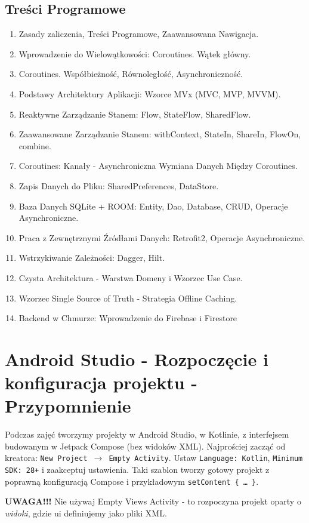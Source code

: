 \subsection{Treści Programowe}
\begin{enumerate}
  \item Zasady zaliczenia, Treści Programowe, Zaawansowana Nawigacja.
  \item Wprowadzenie do Wielowątkowości: Coroutines. Wątek główny.
  \item Coroutines. Współbieżność, Równoległość, Asynchroniczność.
  \item Podstawy Architektury Aplikacji: Wzorce MVx (MVC, MVP, MVVM).
  \item Reaktywne Zarządzanie Stanem: Flow, StateFlow, SharedFlow.
  \item Zaawansowane Zarządzanie Stanem: withContext, StateIn, ShareIn, FlowOn, combine.
  \item Coroutines: Kanały - Asynchroniczna Wymiana Danych Między Coroutines.
  \item Zapis Danych do Pliku: SharedPreferences, DataStore.
  \item Baza Danych SQLite + ROOM: Entity, Dao, Database, CRUD, Operacje Asynchroniczne.
  \item Praca z Zewnętrznymi Źródłami Danych: Retrofit2, Operacje Asynchroniczne.
  \item Wstrzykiwanie Zależności: Dagger, Hilt.
  \item Czysta Architektura - Warstwa Domeny i Wzorzec Use Case.
  \item Wzorzec Single Source of Truth - Strategia Offline Caching.
  \item Backend w Chmurze: Wprowadzenie do Firebase i Firestore
\end{enumerate}

\section{Android Studio - Rozpoczęcie i konfiguracja projektu - Przypomnienie}
Podczas zajęć tworzymy projekty w Android Studio, w Kotlinie, z interfejsem budowanym w Jetpack Compose (bez widoków XML). Najprościej zacząć od kreatora: \texttt{New Project $\rightarrow$ Empty Activity}. Ustaw \texttt{Language: Kotlin}, \texttt{Minimum SDK: 28+} i zaakceptuj ustawienia. Taki szablon tworzy gotowy projekt z poprawną konfiguracją Compose i przykładowym \texttt{setContent \{ … \}}. 

\textbf{UWAGA!!!} Nie używaj Empty Views Activity - to rozpoczyna projekt oparty o \textit{widoki}, gdzie ui definiujemy jako pliki XML.

